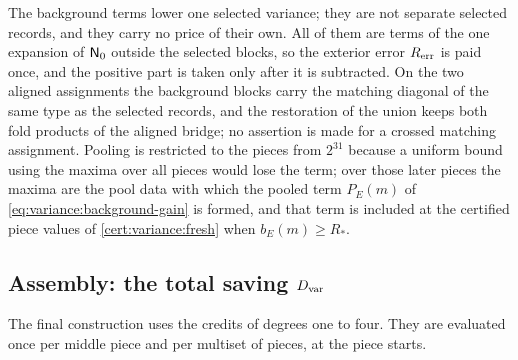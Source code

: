The background terms lower one selected variance; they are not separate
selected records, and they carry no price of their own. All of them are terms
of the one expansion of $\mathsf N_0$ outside the selected blocks, so the exterior error
$R_{\rm err}$ is paid once, and the positive part is taken only after it is
subtracted. On the two aligned assignments the background blocks carry the matching
diagonal of the same type as the selected records, and the restoration of the
union keeps both fold products of the aligned bridge; no assertion is made for a
crossed matching assignment. Pooling is restricted to the pieces
from $2^{31}$ because a uniform bound using the maxima over all
pieces would lose the term; over those later pieces the maxima are the pool data with which
the pooled term $P_E(m)$ of \eqref{eq:variance:background-gain} is
formed, and that term is included at the certified piece values of
\cref{cert:variance:fresh} when $b_E(m)\ge R_*$.

\subsection{Assembly: the total saving \texorpdfstring{$D_{\rm var}$}{D\_var}}\label{subsec:variance:final}

The final construction uses the credits of degrees one to four. They are
evaluated once per middle piece and per multiset of pieces, at the piece
starts.

